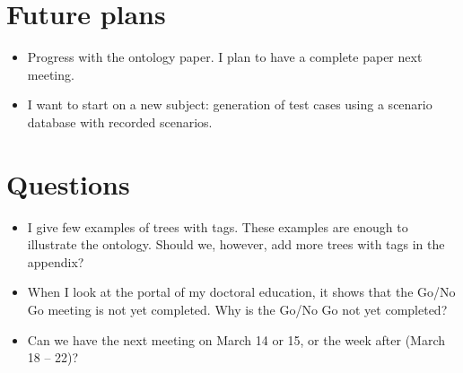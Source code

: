 \documentclass[10pt,final,a4paper,oneside,onecolumn]{article}
\begin{document}
\section{Future plans}

\begin{itemize}
	\item Progress with the ontology paper. I plan to have a complete paper next meeting.
	\item I want to start on a new subject: generation of test cases using a scenario database with recorded scenarios.
\end{itemize}

\section{Questions}

\begin{itemize}
	\item I give few examples of trees with tags. These examples are enough to illustrate the ontology. Should we, however, add more trees with tags in the appendix?
	\item When I look at the portal of my doctoral education, it shows that the Go/No Go meeting is not yet completed. Why is the Go/No Go not yet completed?
	\item Can we have the next meeting on March 14 or 15, or the week after (March 18 -- 22)?
\end{itemize}


\printbibliography


\newpage

\end{document}
